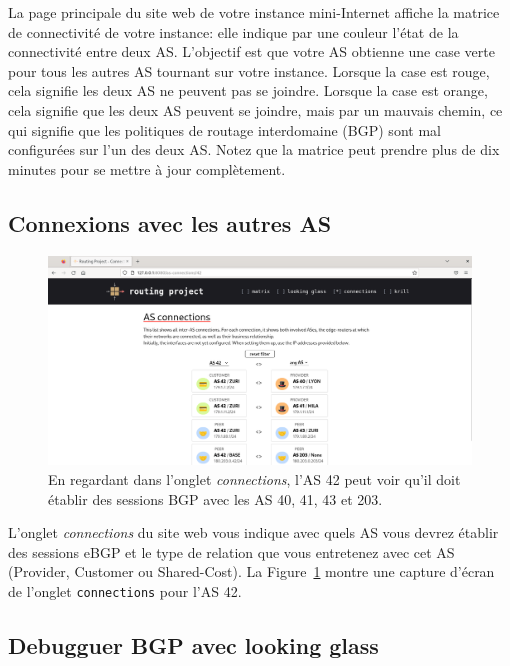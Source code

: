\documentclass[a4paper, 11pt]{article}
\begin{document}
La page principale du site web de votre instance mini-Internet affiche la
matrice de connectivité de votre instance: elle indique par une couleur
l'état de la connectivité entre deux AS. L'objectif est que votre AS
obtienne une case verte pour tous les autres AS tournant sur votre instance.
Lorsque la case est rouge, cela signifie les deux AS ne peuvent pas se joindre.
Lorsque la case est orange, cela signifie que les deux AS peuvent se joindre,
mais par un mauvais chemin, ce qui signifie que les politiques de routage
interdomaine (BGP) sont mal configurées sur l'un des deux AS. Notez que la
matrice peut prendre plus de dix minutes pour se mettre à jour complètement.


\subsection{Connexions avec les autres AS}

\begin{figure}
    \centering
    \includegraphics[width=0.8\linewidth]{figures/as-connections-screenshot.png}
    \caption{En regardant dans l'onglet \textit{connections}, l'AS 42 peut voir
    qu'il doit établir des sessions BGP avec les AS 40, 41, 43 et 203.}
    \label{fig:as-connections-screenshot}
\end{figure}

L'onglet \textit{connections} du site web vous indique avec quels AS vous
devrez établir des sessions eBGP et le type de relation que vous entretenez
avec cet AS (Provider, Customer ou Shared-Cost). La
Figure~\ref{fig:as-connections-screenshot} montre une capture d'écran de l'onglet
\texttt{connections} pour l'AS 42.

\subsection{Debugguer BGP avec looking glass}
\end{document}
